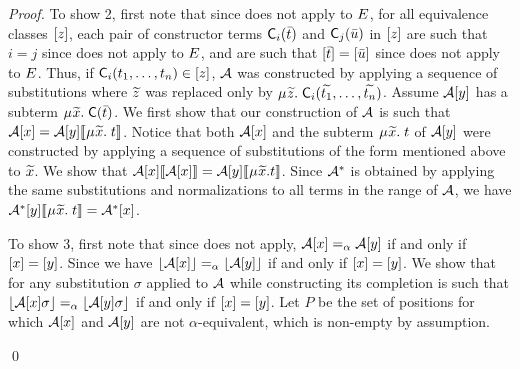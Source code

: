 \begin{proof}
To show 2,
first note that since  does not apply to $E$,
for all equivalence classes $[z]$,
each pair of constructor terms $\textsf{C}_i( \bar t )$ and $\textsf{C}_j( \bar u )$ in $[z]$
are such that $i = j$ since  does not apply to $E$,
and are such that $[ \bar t ] = [ \bar u ]$ since  does not apply to $E$.
Thus, 
if $\textsf{C}_i( t_1, \ldots, t_n ) \in [z]$,
$\mathcal{A}$ was constructed by applying a sequence of substitutions
where ${\widetilde{z}}$ was replaced only by $\MU {\Varec{z}}.\; \const{C}_i( {\Varec{t_1}}, \ldots, {\Varec{t_n}} )$.
Assume $\mathcal{A} [y]$ has a subterm $\MU {\Varec{x}}.\; \const{C}( \vec t )$.
We first show that our construction of $\mathcal{A}$ is such that $\Val \ec{x} = \Val \ec{y}\interp{ \MU {\Varec{x}}.\; t }$.
Notice that both $\mathcal{A} [x]$ and the subterm $\MU {\Varec{x}}.\; t$ of $\mathcal{A} [y]$ were
constructed by applying a sequence of substitutions of the form mentioned above to ${\widetilde{x}}$.
We show that $\Val \ec{x} \interp{ \Val \ec{x} } = \Val \ec{y} \interp{ \MU {\Varec{x}}.t }$.
Since $\mathcal{A}^\ast$ is obtained by applying the same substitutions and normalizations to all terms in the range of $\mathcal{A}$,
we have $\Val^\ast \ec{y} \interp{ \MU {\Varec{x}}.\; t} = \Val^\ast \ec{x}$.

To show 3,
first note that since  does not apply,
$\mathcal{A} [x] \mathrel{=_\alpha} \mathcal{A} [y]$ if and only if $[x] = [y]$.
Since 
we have $\lfloor\mathcal{A} [x]\rfloor \mathrel{=_\alpha} \lfloor\mathcal{A} [y]\rfloor$ if and only if $[x] = [y]$.
We show that for any substitution $\sigma$ applied to $\mathcal{A}$ while constructing its completion is such that
$\lfloor\mathcal{A} [x] \sigma\rfloor \mathrel{=_\alpha} \lfloor\mathcal{A} [y] \sigma\rfloor$ if and only if $[x] = [y]$.
Let $P$ be the set of positions for which $\mathcal{A} [x]$ and $\mathcal{A} [y]$ are not $\alpha$-equivalent,
which is non-empty by assumption.

\qed
\end{proof}

